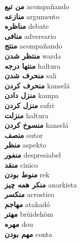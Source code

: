 \textbf{ من تبع  } acompañando \\
\textbf{ منازعه  } argumento \\
\textbf{ مناظره  } debate \\
\textbf{ منافی  } adversario \\
\textbf{ منتج  } acompañando \\
\textbf{ منتظر شدن  } warda \\
\textbf{ منتها درجه  } haltura \\
\textbf{ منحرف شدن  } sali \\
\textbf{ منحرف کردن  } kanselá \\
\textbf{ منزل دادن  } kampa \\
\textbf{ منزل کردن  } sufri \\
\textbf{ منزلت  } haltura \\
\textbf{ منسوخ کردن  } kanselá \\
\textbf{ منصف  } outor \\
\textbf{ منظر  } aspekto \\
\textbf{ منفور  } despresiabel \\
\textbf{ منقد  } cinico \\
\textbf{ منوط بودن  } rek \\
\textbf{ منکر همه چیز  } anarkista \\
\textbf{ منکسر  } acrostico \\
\textbf{ مهاجم  } atakadó \\
\textbf{ مهتر  } brùidehòm \\
\textbf{ مهره  } dou \\
\textbf{ مهم بودن  } conta \\
